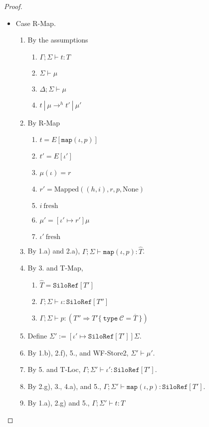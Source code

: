\documentclass{article}
\theoremstyle{definition}
\newcommand{\seq}[1]{\overline{#1}}
\begin{document}
\begin{proof}
\begin{itemize}
\item Case R-Map.
\begin{enumerate}
\item By the assumptions
  \begin{enumerate}[label=(\alph*)]
  \item $\Gamma ; \Sigma \vdash t : T$
  \item $\Sigma \vdash \mu$
  \item $\Delta ; \Sigma \vdash \mu$ 
  \item $t~|~\mu \rightarrow^h t'~|~\mu'$
  \end{enumerate}
\item By R-Map
  \begin{enumerate}[label=(\alph*)]
  \item $t = E[\texttt{map}(\iota, p)]$
  \item $t' = E[\iota']$
  \item $\mu(\iota) = r$
  \item $r' = \text{Mapped}((h, i), r, p, \text{None})$
  \item $i~\text{fresh}$
  \item $\mu' = [\iota' \mapsto r']\mu$
  \item $\iota'~\text{fresh}$
  \end{enumerate}
\item By 1.a) and 2.a), $\Gamma ; \Sigma \vdash \texttt{map}(\iota, p) : \hat{T}$.
\item By 3. and T-Map,
  \begin{enumerate}[label=(\alph*)]
  \item $\hat{T} = \texttt{SiloRef}[T']$
  \item $\Gamma ; \Sigma \vdash \iota : \texttt{SiloRef}[T'']$
  \item $\Gamma ; \Sigma \vdash p : (T'' \Rightarrow T' \{~\texttt{type}~\mathcal{C} = \seq{T}~\})$
  \end{enumerate}
\item Define $\Sigma' := [\iota' \mapsto \texttt{SiloRef}[T']]\Sigma$.
\item By 1.b), 2.f), 5., and WF-Store2, $\Sigma' \vdash \mu'$.
\item By 5. and T-Loc, $\Gamma ; \Sigma' \vdash \iota' : \texttt{SiloRef}[T']$.
\item By 2.g), 3., 4.a), and 5., $\Gamma ; \Sigma' \vdash \texttt{map}(\iota, p) : \texttt{SiloRef}[T']$.
\item By 1.a), 2.g) and 5., $\Gamma ; \Sigma' \vdash t : T$

\end{enumerate}
\end{itemize}
\end{proof}
\end{document}

